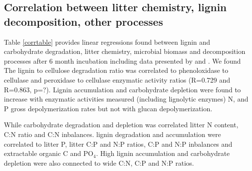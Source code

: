 \documentclass[authoryear,preprint,review,12pt]{elsarticle}
\begin{document}

\subsection{Correlation between litter chemistry, lignin decomposition, other processes}

Table \ref{corrtable} provides linear regressions found between lignin and carbohydrate degradation, litter chemistry, microbial biomass and decomposition processes after 6 month incubation including data presented by \cite{Mooshammer2011} and \cite{Leitner2011}. We found  The lignin to cellulose degradation ratio was correlated to phenoloxidase to cellulase and peroxidase to cellulase enzymatic activity ratios (R=0.729 and R=0.863, p=?). Lignin accumulation and carbohydrate depletion were found to increase with enzymatic activities measured (including lignolytic enzymes) N, and P gross depolymerization rates but not with glucan depolymerization.

While carbohydrate degradation and depletion was correlated litter N content, C:N ratio and C:N inbalances. lignin degradation and accumulation were correlated to litter P, litter C:P and N:P ratios, C:P and N:P inbalances and extractable organic C and PO$_4$. High lignin accumulation and carbohydrate depletion were also connected to wide C:N, C:P and N:P ratios.
\end{document}
